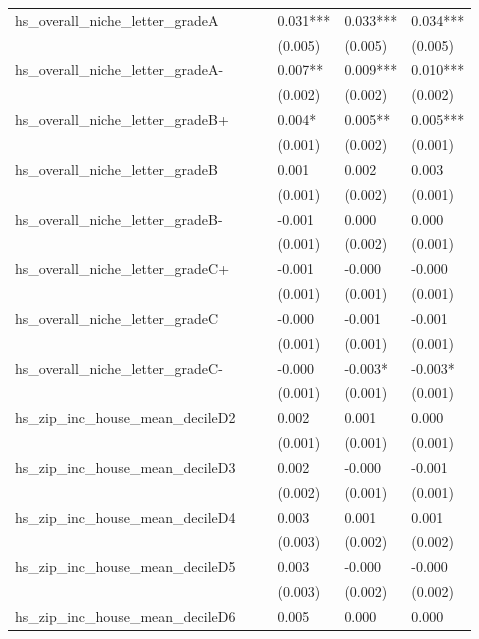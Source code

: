 \begin{longtable}[t]{llllll}
\addlinespace
hs\_overall\_niche\_letter\_gradeA &  &  & 0.031*** & 0.033*** & 0.034***\\
 &  &  & (0.005) & (0.005) & (0.005)\\
hs\_overall\_niche\_letter\_gradeA- &  &  & 0.007** & 0.009*** & 0.010***\\
 &  &  & (0.002) & (0.002) & \vphantom{2} (0.002)\\
hs\_overall\_niche\_letter\_gradeB+ &  &  & 0.004* & 0.005** & 0.005***\\
\addlinespace
 &  &  & (0.001) & (0.002) & \vphantom{3} (0.001)\\
hs\_overall\_niche\_letter\_gradeB &  &  & 0.001 & 0.002 & 0.003\\
 &  &  & (0.001) & (0.002) & \vphantom{2} (0.001)\\
hs\_overall\_niche\_letter\_gradeB- &  &  & -0.001 & 0.000 & 0.000\\
 &  &  & (0.001) & (0.002) & \vphantom{1} (0.001)\\
\addlinespace
hs\_overall\_niche\_letter\_gradeC+ &  &  & -0.001 & -0.000 & -0.000\\
 &  &  & (0.001) & (0.001) & \vphantom{6} (0.001)\\
hs\_overall\_niche\_letter\_gradeC &  &  & -0.000 & -0.001 & -0.001\\
 &  &  & (0.001) & (0.001) & \vphantom{5} (0.001)\\
hs\_overall\_niche\_letter\_gradeC- &  &  & -0.000 & -0.003* & -0.003*\\
\addlinespace
 &  &  & (0.001) & (0.001) & \vphantom{4} (0.001)\\
hs\_zip\_inc\_house\_mean\_decileD2 &  &  & 0.002 & 0.001 & 0.000\\
 &  &  & (0.001) & (0.001) & \vphantom{3} (0.001)\\
hs\_zip\_inc\_house\_mean\_decileD3 &  &  & 0.002 & -0.000 & -0.001\\
 &  &  & (0.002) & (0.001) & \vphantom{1} (0.001)\\
\addlinespace
hs\_zip\_inc\_house\_mean\_decileD4 &  &  & 0.003 & 0.001 & 0.001\\
 &  &  & (0.003) & (0.002) & \vphantom{2} (0.002)\\
hs\_zip\_inc\_house\_mean\_decileD5 &  &  & 0.003 & -0.000 & -0.000\\
 &  &  & (0.003) & (0.002) & \vphantom{1} (0.002)\\
hs\_zip\_inc\_house\_mean\_decileD6 &  &  & 0.005 & 0.000 & 0.000\\

\end{longtable}
